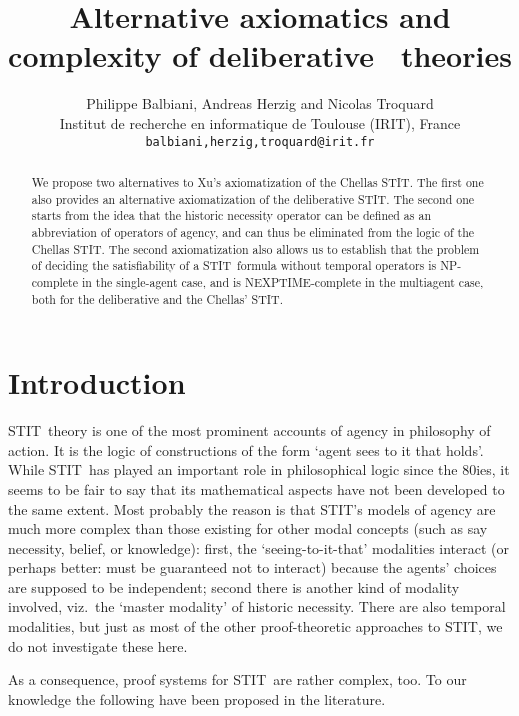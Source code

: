 \documentclass{article}
\title{Alternative axiomatics and complexity of deliberative \STIT\ theories}
\author{Philippe Balbiani, Andreas Herzig and Nicolas Troquard
\\ Institut de recherche en informatique de Toulouse (IRIT), France
\\ \small{\texttt{balbiani,herzig,troquard@irit.fr}}
}
\date{}
\newcommand{\STIT} {{\textsf{STIT}}}              \newcommand{\CSTIT}{{\textsf{CSTIT}}}            \newcommand{\DSTIT}{{\textsf{DSTIT}}}
\begin{document}
\maketitle

\begin{abstract}
We propose two alternatives to Xu's axiomatization of the Chellas \STIT.
The first one also provides an alternative axiomatization of
the deliberative \STIT.
The second one starts from the idea that the historic necessity operator
can be defined as an abbreviation of operators of agency, and
can thus be eliminated from the logic of the Chellas \STIT.
The second axiomatization also allows us to establish
that the problem of deciding the satisfiability of a \STIT\ formula
without temporal operators is NP-complete in the single-agent case, and
is NEXPTIME-complete in the multiagent case, both for the deliberative
and the Chellas' \STIT.
\end{abstract}

\tableofcontents

\section{Introduction}


\STIT\ theory is one of the most prominent accounts of agency in
philosophy of action. It is the logic of constructions of the form
`agent  sees to it that  holds'.
While \STIT\ has played an important role in philosophical logic
since the 80ies, it seems to be fair to say that its mathematical aspects
have not been developed to the same extent. Most probably the reason is that
\STIT's models of agency are much more complex than
those existing for other modal concepts (such as say necessity, belief,
or knowledge): first, the `seeing-to-it-that' modalities interact
(or perhaps better: must be guaranteed not to interact)
because the agents' choices are supposed to be independent;
second there is another kind of modality involved, viz.\
the `master modality' of historic necessity.
There are also temporal modalities, but just as most of the other
proof-theoretic approaches to \STIT, we do not investigate
these here.

As a consequence, proof systems for \STIT\ are rather complex, too.
To our knowledge the following have been proposed in the literature.
\end{document}
